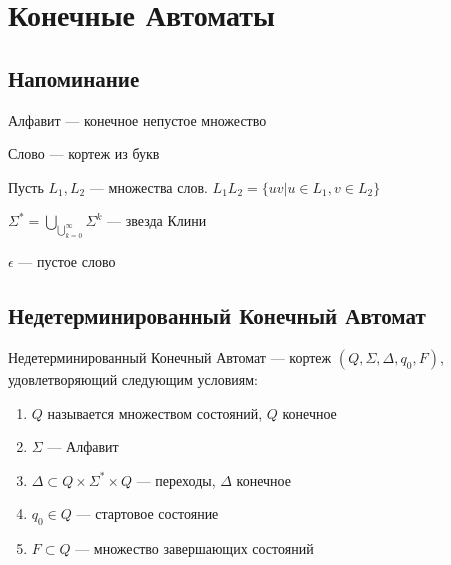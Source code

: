 
\section{Конечные Автоматы}
\subsection{Напоминание}
\begin{definition}
    Алфавит --- конечное непустое множество
\end{definition}

\begin{definition}
    Слово --- кортеж из букв
\end{definition}

\begin{definition}
    Пусть \(L_1, L_2\) --- множества слов. \(L_1L_2 = \{uv | u \in L_1, v \in L_2\}\)
\end{definition}

\begin{definition}
    \(\Sigma^* = \bigcup_{\bigcup_{k = 0}^\infty} \Sigma^k\) --- звезда Клини
\end{definition}

\begin{definition}
    \(\epsilon\) --- пустое слово
\end{definition}

\subsection{Недетерминированный Конечный Автомат}
\begin{definition}
    Недетерминированный Конечный Автомат --- кортеж \((Q, \Sigma, \Delta, q_0, F)\), удовлетворяющий следующим условиям:
    \begin{enumerate}
        \item \(Q\) называется множеством состояний, \(Q\) конечное
        \item \(\Sigma\) --- Алфавит
        \item \(\Delta \subset Q \times \Sigma^* \times Q\) --- переходы, \(\Delta\) конечное
        \item \(q_0 \in Q\) --- стартовое состояние
        \item \(F \subset Q\) --- множество завершающих состояний
    \end{enumerate}
\end{definition}

